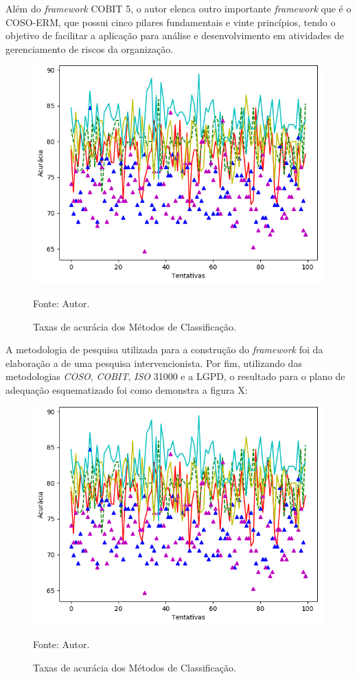 \documentclass[
	12pt,				%
	openright,			%
	oneside,			%
	a4paper,			%
	english,			%
	french,				%
	spanish,			%
	brazil,				%
	]{abntex2}
\begin{document}
Além do \textit{framework}  COBIT 5, o autor elenca outro importante \textit{framework}  que é o COSO-ERM, que possui cinco pilares fundamentais e vinte princípios, tendo o objetivo de facilitar a aplicação para análise e desenvolvimento em atividades de gerenciamento de riscos da organização.

\begin{figure}[ht]
    \centering
    \caption{Taxas de acurácia dos Métodos de Classificação.}
    \includegraphics[width=5.0in]{Images/acc-classification.png}
    \label{fig: grafico-acc}
    
    \centering \small Fonte: Autor.
\end{figure}


A metodologia de pesquisa utilizada para a construção do \textit{framework}  foi da elaboração a de uma pesquisa intervencionista. Por fim, utilizando das metodologias \textit{COSO}, \textit{COBIT}, \textit{ISO} 31000 e a LGPD, o resultado para o plano de adequação esquematizado foi como demonstra a figura X: 


\begin{figure}[ht]
    \centering
    \caption{Taxas de acurácia dos Métodos de Classificação.}
    \includegraphics[width=5.0in]{Images/acc-classification.png}
    \label{fig: grafico-acc}
    
    \centering \small Fonte: Autor.
\end{figure}
\end{document}
